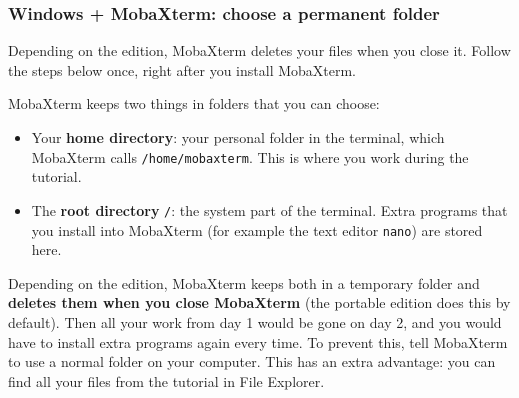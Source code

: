 \documentclass[
  letterpaper,
  DIV=11,
  numbers=noendperiod]{scrreprt}
\providecommand{\tightlist}{%
  \setlength{\itemsep}{0pt}\setlength{\parskip}{0pt}}
\begin{document}
\subsubsection{Windows + MobaXterm: choose a permanent
folder}\label{windows-mobaxterm-choose-a-permanent-folder}

\begin{tcolorbox}[enhanced jigsaw, opacityback=0, colframe=quarto-callout-important-color-frame, bottomtitle=1mm, breakable, leftrule=.75mm, toptitle=1mm, rightrule=.15mm, colbacktitle=quarto-callout-important-color!10!white, titlerule=0mm, coltitle=black, title=\textcolor{quarto-callout-important-color}{\faExclamation}\hspace{0.5em}{MobaXterm users: do this step, or you may lose your work}, bottomrule=.15mm, arc=.35mm, toprule=.15mm, left=2mm, opacitybacktitle=0.6, colback=white]

Depending on the edition, MobaXterm deletes your files when you close
it. Follow the steps below once, right after you install MobaXterm.

\end{tcolorbox}

MobaXterm keeps two things in folders that you can choose:

\begin{itemize}
\tightlist
\item
  Your \textbf{home directory}: your personal folder in the terminal,
  which MobaXterm calls \texttt{/home/mobaxterm}. This is where you work
  during the tutorial.
\item
  The \textbf{root directory} \texttt{/}: the system part of the
  terminal. Extra programs that you install into MobaXterm (for example
  the text editor \texttt{nano}) are stored here.
\end{itemize}

Depending on the edition, MobaXterm keeps both in a temporary folder and
\textbf{deletes them when you close MobaXterm} (the portable edition
does this by default). Then all your work from day 1 would be gone on
day 2, and you would have to install extra programs again every time. To
prevent this, tell MobaXterm to use a normal folder on your computer.
This has an extra advantage: you can find all your files from the
tutorial in File Explorer.
\end{document}
